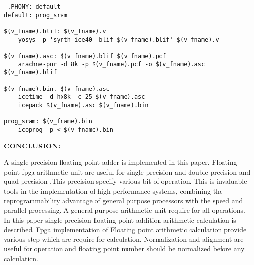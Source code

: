 \documentclass{article}
\begin{document}
 \begin{lstlisting}
 .PHONY: default
default: prog_sram

$(v_fname).blif: $(v_fname).v 
	yosys -p 'synth_ice40 -blif $(v_fname).blif' $(v_fname).v

$(v_fname).asc: $(v_fname).blif $(v_fname).pcf 
	arachne-pnr -d 8k -p $(v_fname).pcf -o $(v_fname).asc $(v_fname).blif

$(v_fname).bin: $(v_fname).asc 
	icetime -d hx8k -c 25 $(v_fname).asc 
	icepack $(v_fname).asc $(v_fname).bin

prog_sram: $(v_fname).bin
	icoprog -p < $(v_fname).bin
	\end{lstlisting}
	\bigskip 
	\bigskip 
\begin{center}
\textbf{CONCLUSION:}
\bigskip 

\end{center}
\bigskip 
A single precision floating-point adder is implemented in this paper. Floating point fpga arithmetic unit are useful for single precision and double precision and quad precision .This precision specify various bit of operation. This is invaluable tools in the implementation of high performance systems, combining the reprogrammability advantage of general purpose processors with the speed and parallel processing. A general purpose arithmetic unit require for all operations. In this paper single precision floating point addition arithmetic calculation is described. Fpga implementation of Floating point arithmetic calculation provide various step which are require for calculation. Normalization and alignment are useful for operation and floating point number should be normalized before any calculation.
\end{document}

